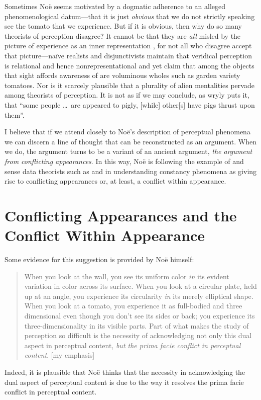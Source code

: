 \documentclass[12pt]{article}
\begin{document}
Sometimes Noë seems motivated by a dogmatic adherence to an alleged phenomenological datum---that it is just \emph{obvious} that we do not strictly speaking see the tomato that we experience. But if it is obvious, then why do so many theorists of perception disagree? It cannot be that they are \emph{all} misled by the picture of experience as an inner representation \citep[chapter 2]{Noe:2004fk}, for not all who disagree accept that picture---naïve realists and disjunctivists maintain that veridical perception is relational and hence nonrepresentational and yet claim that among the objects that sight affords awareness of are voluminous wholes such as garden variety tomatoes. Nor is it scarcely plausible that a plurality of alien mentalities pervade among theorists of perception. It is not as if we may conclude, as \citet[69]{Sartwell:1995ve} wryly puts it, that ``some people \ldots\ are appeared to pigly, [while] other[s] have pigs thrust upon them''. 

I believe that if we attend closely to Noë's description of perceptual phenomena we can discern a line of thought that can be reconstructed as an argument. When we do, the argument turns to be a variant of an ancient argument, \emph{the argument from conflicting appearances}. In this way, Noë is following the example of \citet{Berkeley:1734fk} and sense data theorists such as \citet{Russell:1912uq} and \citet{Price:1932fk} in understanding constancy phenomena as giving rise to conflicting appearances or, at least, a conflict within appearance.


\section{Conflicting Appearances and the Conflict Within Appearance}\label{sec:conflicting_appearances} %

Some evidence for this suggestion is provided by Noë himself:
	\begin{quote}
		When you look at the wall, you see its uniform color \emph{in} its evident variation in color across its surface. When you look at a circular plate, held up at an angle, you experience its circularity \emph{in} its merely elliptical shape. When you look at a tomato, you experience it as full-bodied and three dimensional even though you don't see its sides or back; you experience its three-dimensionality in its visible parts. Part of what makes the study of perception so difficult is the necessity of acknowledging not only this dual aspect in perceptual content, \emph{but the prima facie conflict in perceptual content}. [my emphasis]
	\end{quote}
Indeed, it is plausible that Noë thinks that the necessity in acknowledging the dual aspect of perceptual content is due to the way it resolves the prima facie conflict in perceptual content.
\end{document}
